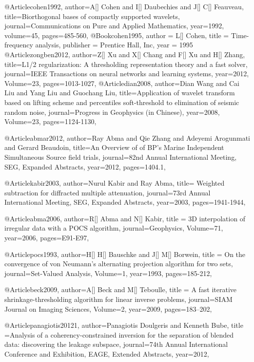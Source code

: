 @Article{cohen1992,
  author={A[] Cohen and I[] Daubechies and J[] C[] Feauveau},
  title={Biorthogonal bases of compactly supported wavelets},
  journal={Communications on Pure and Applied Mathematics},
  year=1992,
  volume=45,
  pages={485-560},
}
@Book{cohen1995,
  author = 	 {L[] Cohen},
  title = 	 { Time-frequency analysis},
  publisher = 	 {Prentice Hall, Inc},
  year = 	 1995}
@Article{zongben2012,
  author={Z[] Xu and X[] Chang and F[] Xu and H[] Zhang},
  title={{L}1/2 regularization: A thresholding representation theory and a fast solver},
  journal={IEEE Transactions on neural networks and learning systems},
  year=2012,
  Volume=23,
  pages={1013-1027},
}
@Article{dian2008,
  author={Dian Wang and Cai Liu and Yang Liu and Guochang Liu},
  title={Application of wavelet transform based on lifting scheme and percentiles soft-threshold to elimination of seismic random noise},
  journal={Progress in Geophysics (in Chinese)},
  year=2008,
  Volume=23,
  pages={1124-1130},
}


@Article{abmar2012,
  author={Ray Abma and Qie Zhang and Adeyemi Arogunmati and Gerard Beaudoin},
  title={An Overview of of {BP}'s Marine Independent Simultaneous Source field trials},
  journal={82nd Annual International Meeting, SEG, Expanded Abstracts},
  year=2012,
  pages={1404.1},
}

@Article{kabir2003,
  author={Nurul Kabir and Ray Abma},
  title={	Weighted subtraction for diffracted multiple attenuation},
  journal={73rd Annual International Meeting, SEG, Expanded Abstracts},
  year=2003,
  pages={1941-1944},
}

@Article{abma2006,
  author={R[] Abma and N[] Kabir},
  title = {3{D} interpolation of irregular data with a {POCS} algorithm},
  journal={Geophysics},
  Volume=71,
  year=2006,
  pages={E91-E97},
}

@Article{pocs1993,
  author={H[] H[] Bauschke and J[] M[] Borwein},
  title = {On the convergence of von Neumann's alternating projection algorithm for two sets},
  journal={Set-Valued Analysis},
  Volume=1,
  year=1993,
  pages={185-212},
}


@Article{beck2009,
  author={A[] Beck and M[] Teboulle},
  title = {A fast iterative shrinkage-thresholding algorithm for
linear inverse problems},
  journal={SIAM Journal on Imaging Sciences},
  Volume=2,
  year=2009,
  pages={183–202},
}

@Article{panagiotis20121,
  author={Panagiotis Doulgeris and Kenneth Bube},
  title ={Analysis of a coherency-constrained inversion for the separation of blended data: discovering the leakage subspace},
  journal={74th Annual International Conference and Exhibition, EAGE, Extended Abstracts},
  year=2012,
  }

